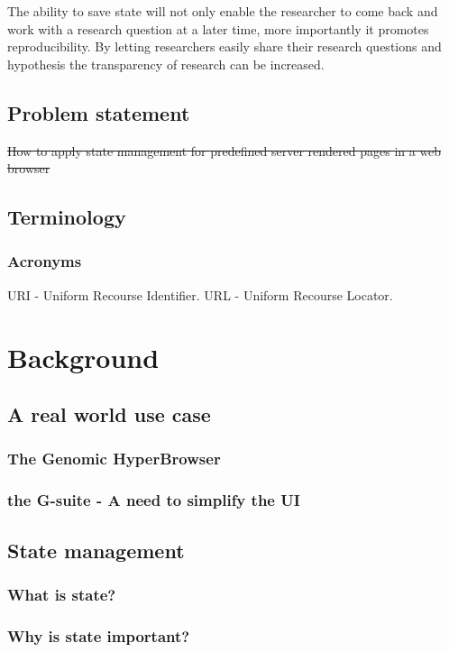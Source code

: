 \documentclass[english]{ifimaster}
\begin{document}
The ability to save state will not only enable the researcher to come back and work with a research question at a later time, more importantly it promotes reproducibility. By letting researchers easily share their research questions and hypothesis the transparency of research can be increased. 


\section{Problem statement}
\sout{How to apply state management for predefined server rendered pages in a web browser}

\section{Terminology}

\subsection{Acronyms}
URI - Uniform Recourse Identifier.
URL - Uniform Recourse Locator. 



\chapter{Background}
\section{A real world use case}
\subsection{The Genomic HyperBrowser}
\subsection{the G-suite - A need to simplify the UI}

\section{State management}
\subsection{What is state?}
\label{sec:state}
\subsection{Why is state important?}
\end{document}
